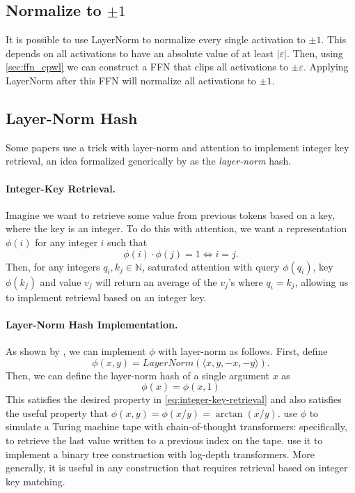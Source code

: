 \subsection{Normalize to $\pm1$}

It is possible to use LayerNorm to normalize every single activation to $\pm1$. This depends on all activations to have an absolute value of at least $|\varepsilon|$. Then, using \ref{sec:ffn_cpwl} we can construct a FFN that clips all activations to $\pm\varepsilon$. Applying LayerNorm after this FFN will normalize all activations to $\pm1$.

\subsection{Layer-Norm Hash} \label{sec:ln_hash}

Some papers \citep{yao-2021-self-attention,merrill-sabharwal-2024-cot,merrill2024little} use a trick with layer-norm and attention to implement integer key retrieval, an idea formalized generically by \citet{merrill-sabharwal-2024-cot} as the \emph{layer-norm} hash.

\paragraph{Integer-Key Retrieval.}
Imagine we want to retrieve some value from previous tokens based on a key, where the key is an integer.
To do this with attention, we want a representation $\phi(i)$ for any integer $i$ such that
\begin{equation*} \label{eq:integer-key-retrieval}
    \phi(i) \cdot \phi(j) = 1 \iff i = j .
\end{equation*}
Then, for any integers $q_i, k_j \in \mathbb N$, saturated attention with query $\phi(q_i)$, key $\phi(k_j)$ and value $v_j$ will return an average of the $v_j$'s where $q_i = k_j$, allowing us to implement retrieval based on an integer key.

\paragraph{Layer-Norm Hash Implementation.}
As shown by \citet{merrill-sabharwal-2024-cot}, we can implement $\phi$ with layer-norm as follows. First, define
\begin{equation*}
    \phi(x, y) = LayerNorm(\langle x, y, -x, -y \rangle) .
\end{equation*}
Then, we can define the layer-norm hash of a single argument $x$ as
\begin{equation*}
    \phi(x) = \phi(x, 1)
\end{equation*}
This satisfies the desired property in \eqref{eq:integer-key-retrieval} and also satisfies the useful property that $\phi(x, y) = \phi(x/y) = \arctan(x/y)$.
\citet{merrill-sabharwal-2024-cot} use $\phi$ to simulate a Turing machine tape with chain-of-thought transformers: specifically, to retrieve the last value written to a previous index on the tape.
\citet{merrill2024little} use it to implement a binary tree construction with log-depth transformers.
More generally, it is useful in any construction that requires retrieval based on integer key matching.

